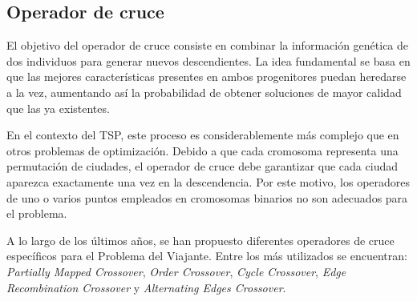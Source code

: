 \subsection{Operador de cruce}
\label{subsec:cross}

El objetivo del operador de cruce consiste en combinar la información genética de dos individuos para generar nuevos
descendientes. La idea fundamental se basa en que las mejores características presentes en ambos progenitores puedan heredarse
a la vez, aumentando así la probabilidad de obtener soluciones de mayor calidad que las ya existentes. 

En el contexto del TSP, este proceso es considerablemente más complejo que en otros problemas de optimización. Debido a que cada
cromosoma representa una permutación de ciudades, el operador de cruce debe garantizar que cada ciudad aparezca exactamente una 
vez en la descendencia. Por este motivo, los operadores de uno o varios puntos empleados en cromosomas binarios no son adecuados
para el problema.

A lo largo de los últimos años, se han propuesto diferentes operadores de cruce específicos para el Problema del Viajante. 
Entre los más utilizados se encuentran: \textit{Partially Mapped Crossover}, \textit{Order Crossover}, \textit{Cycle Crossover}, 
\textit{Edge Recombination Crossover} y \textit{Alternating Edges Crossover}.

